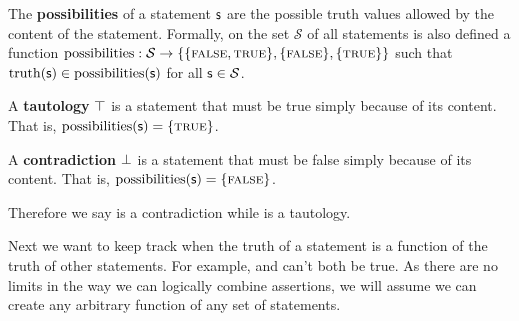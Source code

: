 \documentclass[11pt,letterpaper,fleqn]{memoir} %
\begin{document}
\begin{mathSection}
	
	\begin{defn}\label{def_possibilities}
		The \textbf{possibilities} of a statement $\mathsf{s}$ are the possible truth values allowed by the content of the statement. Formally, on the set $\mathcal{S}$ of all statements is also defined a function $\operatorname{possibilities}: \mathcal{S} \to \{\{\textsc{false}, \textsc{true}\},\{\textsc{false}\},\{\textsc{true}\}\}$ such that $\operatorname{truth}(\mathsf{s}) \in \operatorname{possibilities}(\mathsf{s})$ for all $\mathsf{s} \in \mathcal{S}$.
	\end{defn}
	
	\begin{defn}
		A \textbf{tautology} $\top$ is a statement that must be true simply because of its content. That is, $\operatorname{possibilities}(\mathsf{s}) = \{\textsc{true}\}$.
	\end{defn}
	
	\begin{defn}
		A \textbf{contradiction} $\bot$ is a statement that must be false simply because of its content. That is, $\operatorname{possibilities}(\mathsf{s}) = \{\textsc{false}\}$.
	\end{defn}
	
\end{mathSection}

Therefore we say  is a contradiction while  is a tautology.

Next we want to keep track when the truth of a statement is a function of the truth of other statements. For example,  and  can't both be true. As there are no limits in the way we can logically combine assertions, we will assume we can create any arbitrary function of any set of statements.
\end{document}
